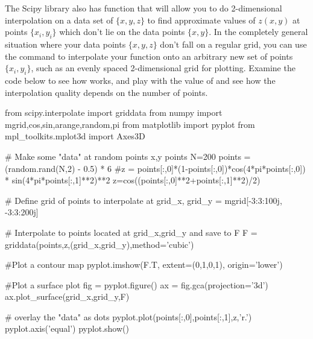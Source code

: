   The Scipy library
also has function that will allow you to do 2-dimensional interpolation on a
data set of $\{x,y,z\}$ to find approximate values of $z(x,y)$ at
points $\{x_i,y_i\}$ which don't lie on the data points $\{x,y\}$.  In
the completely general situation where your data points $\{x,y,z\}$
don't fall on a regular grid, you can use the command 
to interpolate your function onto an arbitrary new set of points
$\{x_i,y_i\}$, such as an evenly spaced 2-dimensional grid for
plotting. Examine the code below to see how 
works, and play with the value of  and see how the
interpolation quality depends on the number of points.
\begin{codeexample}
\begin{VerbatimOut}{\listingFile}
from scipy.interpolate import griddata
from numpy import mgrid,cos,sin,arange,random,pi
from matplotlib import pyplot
from mpl_toolkits.mplot3d import Axes3D


# Make some "data" at random points x,y points
N=200
points = (random.rand(N,2) - 0.5) * 6
#z = points[:,0]*(1-points[:,0])*cos(4*pi*points[:,0]) *
sin(4*pi*points[:,1]**2)**2
z=cos((points[:,0]**2+points[:,1]**2)/2)

# Define grid of points to interpolate at
grid_x, grid_y = mgrid[-3:3:100j, -3:3:200j]

# Interpolate to points located at grid_x,grid_y and save to F
F = griddata(points,z,(grid_x,grid_y),method='cubic')

#Plot a contour map
pyplot.imshow(F.T, extent=(0,1,0,1), origin='lower')

#Plot a surface plot
fig = pyplot.figure()
ax = fig.gca(projection='3d')
ax.plot_surface(grid_x,grid_y,F)

# overlay the "data" as dots
pyplot.plot(points[:,0],points[:,1],z,'r.')
pyplot.axis('equal')
pyplot.show()
\end{VerbatimOut}
\end{codeexample}

